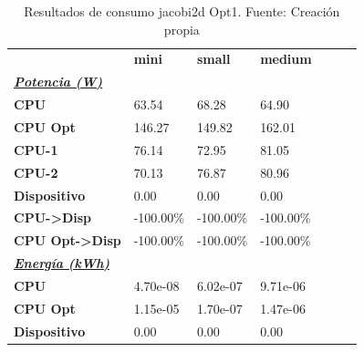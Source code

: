 \begin{table}[H]
    \centering
    \begin{tabular}{lllllll}
    \rowcolor[HTML]{DAE8FC} \ & \textbf{mini} & \textbf{	small} & \textbf{	medium} \\
    \cellcolor[HTML]{DAE8FC} \textbf{\textbf{{\emph{{\underline{{Potencia (W)}}}}}}} &  & 	 & 	 \\
    \rowcolor[HTML]{EFEFEF} \cellcolor[HTML]{DAE8FC} \textbf{CPU} & 63.54 & 	68.28 & 	64.90 \\
    \cellcolor[HTML]{DAE8FC} \textbf{CPU Opt} & 146.27 & 	149.82 & 	162.01 \\
    \rowcolor[HTML]{EFEFEF} \cellcolor[HTML]{DAE8FC} \textbf{\quad CPU-1} & 76.14 & 	72.95 & 	81.05 \\
    \cellcolor[HTML]{DAE8FC} \textbf{\quad CPU-2} & 70.13 & 	76.87 & 	80.96 \\
    \rowcolor[HTML]{EFEFEF} \cellcolor[HTML]{DAE8FC} \textbf{Dispositivo} & 0.00 & 	0.00 & 	0.00 \\
    \cellcolor[HTML]{DAE8FC} \textbf{CPU->Disp} & -100.00\% & 	-100.00\% & 	-100.00\% \\
    \rowcolor[HTML]{EFEFEF} \cellcolor[HTML]{DAE8FC} \textbf{CPU Opt->Disp} & -100.00\% & 	-100.00\% & 	-100.00\% \\
    \cellcolor[HTML]{DAE8FC} \textbf{\textbf{{\emph{{\underline{{Energía (kWh)}}}}}}} &  & 	 & 	 \\
    \rowcolor[HTML]{EFEFEF} \cellcolor[HTML]{DAE8FC} \textbf{CPU} & 4.70e-08 & 	6.02e-07 & 	9.71e-06 \\
    \cellcolor[HTML]{DAE8FC} \textbf{CPU Opt} & 1.15e-05 & 	1.70e-07 & 	1.47e-06 \\
    \rowcolor[HTML]{EFEFEF} \cellcolor[HTML]{DAE8FC} \textbf{Dispositivo} & 0.00 & 	0.00 & 	0.00 \\
    \end{tabular}
    \caption[Resultados de consumo jacobi2d Opt1]{{Resultados de consumo jacobi2d Opt1. Fuente: Creación propia}}
    \label{table_test_jacobi2d_Opt1_hw_powerResults}
\end{table}